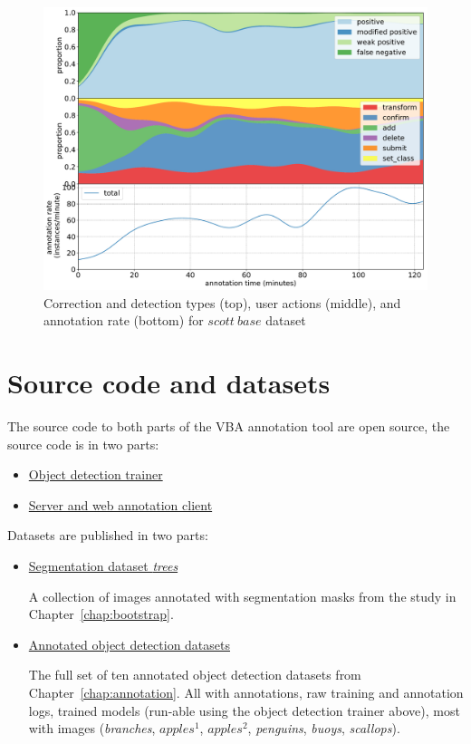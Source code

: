 \begin{figure}[!h]
\centering
\includegraphics[width=1.0\linewidth]{charts/action_annotations/scott_base.pdf}
\caption{ Correction and detection types (top), user actions (middle), and annotation rate (bottom) for $scott\:base$ dataset }
\label{fig:scott_base_annotation}
\end{figure}

\chapter{Source code and datasets}
\label{chap:resources} 

The source code to both parts of the \gls{VBA} annotation tool are open source, the source code is in two parts: 

\begin{itemize}
    \item \href{http://www.github.com/saulzar/detection}{Object detection trainer} 
    \item \href{http://www.github.com/saulzar/annotate}{Server and web annotation client}
\end{itemize}
 
  
Datasets are published in two parts:
 
 \begin{itemize}
\item \href{http://academictorrents.com/details/d8ceccf6d9a57b799003205e0567e630b0ecb90e}{Segmentation dataset \emph{trees}} \par
A collection of images annotated with segmentation masks from the study in Chapter~\ref{chap:bootstrap}.

\item \href{http://academictorrents.com/details/e780e1a9e898e53e72c16cb5fcc6d61d90cc4d27}{Annotated object detection datasets} \par
The full set of ten annotated object detection datasets from Chapter~\ref{chap:annotation}. All with annotations, raw training and annotation logs, trained models (run-able using the object detection trainer above), most with images (\emph{branches}, $apples^1$, $apples^2$, \emph{penguins}, \emph{buoys}, \emph{scallops}).

\end{itemize}

